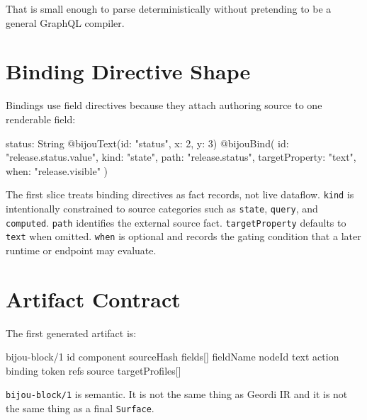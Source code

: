 That is small enough to parse deterministically without pretending to be a general GraphQL compiler.

\section{Binding Directive Shape}\label{record-140-binding-directive-shape}

Bindings use field directives because they attach authoring source to one renderable field:

\begin{CodeBlock}
status: String
  @bijouText(id: "status", x: 2, y: 3)
  @bijouBind(
    id: "release.status.value",
    kind: "state",
    path: "release.status",
    targetProperty: "text",
    when: "release.visible"
  )
\end{CodeBlock}

The first slice treats binding directives as fact records, not live dataflow. \texttt{k\allowbreak{}i\allowbreak{}n\allowbreak{}d} is intentionally constrained to source categories such as \texttt{s\allowbreak{}t\allowbreak{}a\allowbreak{}t\allowbreak{}e}, \texttt{q\allowbreak{}u\allowbreak{}e\allowbreak{}r\allowbreak{}y}, and \texttt{c\allowbreak{}o\allowbreak{}m\allowbreak{}p\allowbreak{}u\allowbreak{}t\allowbreak{}e\allowbreak{}d}. \texttt{p\allowbreak{}a\allowbreak{}t\allowbreak{}h} identifies the external source fact. \texttt{t\allowbreak{}a\allowbreak{}r\allowbreak{}g\allowbreak{}e\allowbreak{}t\allowbreak{}P\allowbreak{}r\allowbreak{}o\allowbreak{}p\allowbreak{}e\allowbreak{}r\allowbreak{}t\allowbreak{}y} defaults to \texttt{t\allowbreak{}e\allowbreak{}x\allowbreak{}t} when omitted. \texttt{w\allowbreak{}h\allowbreak{}e\allowbreak{}n} is optional and records the gating condition that a later runtime or endpoint may evaluate.

\section{Artifact Contract}\label{record-140-artifact-contract}

The first generated artifact is:

\begin{CodeBlock}
bijou-block/1
  id
  component
  sourceHash
  fields[]
    fieldName
    nodeId
    text
    action
    binding
    token refs
    source
  targetProfiles[]
\end{CodeBlock}

\texttt{b\allowbreak{}i\allowbreak{}j\allowbreak{}o\allowbreak{}u\allowbreak{}-\allowbreak{}b\allowbreak{}l\allowbreak{}o\allowbreak{}c\allowbreak{}k\allowbreak{}/\allowbreak{}1} is semantic. It is not the same thing as Geordi IR and it is not the same thing as a final \texttt{S\allowbreak{}u\allowbreak{}r\allowbreak{}f\allowbreak{}a\allowbreak{}c\allowbreak{}e}.

